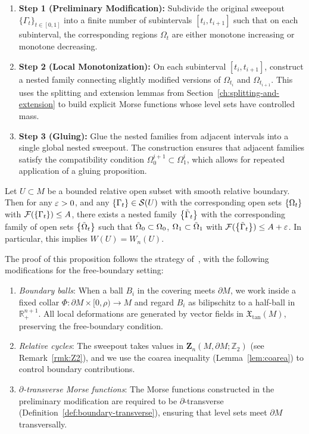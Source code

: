 \begin{enumerate}
\item \textbf{Step 1 (Preliminary Modification):} Subdivide the original sweepout $\{\Gamma_t\}_{t\in[0,1]}$
into a finite number of subintervals $[t_i, t_{i+1}]$ such that on each subinterval, the corresponding
regions $\Omega_t$ are either monotone increasing or monotone decreasing.

\item \textbf{Step 2 (Local Monotonization):} On each subinterval $[t_i, t_{i+1}]$, construct a nested
family connecting slightly modified versions of $\Omega_{t_i}$ and $\Omega_{t_{i+1}}$. This uses the
splitting and extension lemmas from Section~\ref{ch:splitting-and-extension} to build explicit Morse
functions whose level sets have controlled mass.

\item \textbf{Step 3 (Gluing):} Glue the nested families from adjacent intervals into a single global
nested sweepout. The construction ensures that adjacent families satisfy the compatibility condition
$\Omega_0^{i+1} \subset \Omega_1^i$, which allows for repeated application of a gluing proposition.
\end{enumerate}
\begin{proposition}\label{prop:nested-sweepout}
    Let $U \subset M$ be a bounded relative open subset with smooth relative boundary. Then for any $\varepsilon > 0$, and any $\left\{\Gamma_t\right\} \in \mathcal{S}(U)$ with the corresponding open sets $\left\{\Omega_t\right\}$ with $\mathcal{F}(\left\{\Gamma_t\right\}) \leq A$, there exists a nested family $\left\{\Tilde{\Gamma}_t\right\}$ with the corresponding family of open sets $\left\{\Tilde{\Omega}_t\right\}$ such that $\Tilde{\Omega}_0 \subset \Omega_0$, $\Omega_1 \subset \Tilde{\Omega}_1$ with $\mathcal{F}(\left\{\Tilde{\Gamma}_t\right\}) \leq A + \varepsilon$. In particular, this implies $W(U) = W_n(U)$.
\end{proposition}
The proof of this proposition follows the strategy of~\cite[Lemma 6.2]{CL20}, with the following modifications for the free-boundary setting:
\begin{enumerate}[label=\textup{(\roman*)}]
    \item \emph{Boundary balls}: When a ball $B_i$ in the covering meets $\partial M$, we work inside a fixed collar $\Phi: \partial M \times [0, \rho) \to M$ and regard $B_i$ as bilipschitz to a half-ball in $\mathbb{R}^{n+1}_+$. All local deformations are generated by vector fields in $\mathfrak{X}_{\mathrm{tan}}(M)$, preserving the free-boundary condition.
    \item \emph{Relative cycles}: The sweepout takes values in $\mathbf{Z}_n(M, \partial M;\mathbb{Z}_2)$ (see Remark~\ref{rmk:Z2}), and we use the coarea inequality (Lemma~\ref{lem:coarea}) to control boundary contributions.
    \item \emph{$\partial$-transverse Morse functions}: The Morse functions constructed in the preliminary modification are required to be $\partial$-transverse (Definition~\ref{def:boundary-transverse}), ensuring that level sets meet $\partial M$ transversally.
\end{enumerate}

